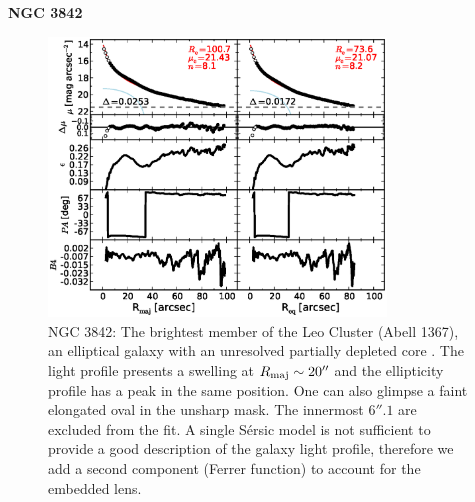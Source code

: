 \documentclass[preprint2]{emulateapj}
\newcommand{\fitfigurewidth}{0.8\textwidth}
\begin{document}
  \clearpage\newpage\noindent
  {\bf NGC 3842 \\}
  
  \begin{figure}[h]
  \begin{center}
  \includegraphics[width=\fitfigurewidth]{n3842exp_1Dfit.eps}
  \caption{NGC 3842: 
  The brightest member of the Leo Cluster (Abell 1367), 
  an elliptical galaxy with an unresolved partially depleted core \citep{rusli2013,dullograham2014cores}. %
  The light profile presents a swelling at $R_{\rm maj} \sim 20''$ and the ellipticity profile has a peak in the same position.
  One can also glimpse a faint elongated oval in the unsharp mask.
  The innermost $6''.1$ are excluded from the fit.
  A single S\'ersic model is not sufficient to provide a good description of the galaxy light profile, 
  therefore we add a second component (Ferrer function) to account for the embedded lens.
  }
  \end{center}
  \end{figure}
\end{document}
